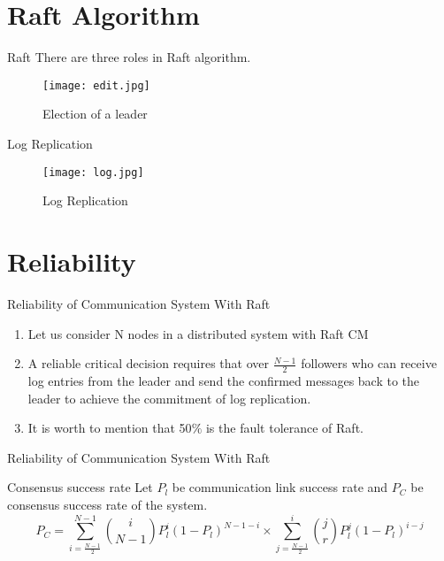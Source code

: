 \documentclass{beamer}
\begin{document}
\section{Raft Algorithm}
\begin{frame}{Raft}
There are three roles in Raft algorithm.
\begin{figure}
    \centering
    \texttt{[image: edit.jpg]}
    \caption{Election of a leader}
\end{figure}

\end{frame}
\begin{frame}{Log Replication}
\begin{figure}
    \centering
    \texttt{[image: log.jpg]}
    \caption{Log Replication}
\end{figure}
    
\end{frame}

\section{Reliability}
\begin{frame}{Reliability of Communication System With Raft}
\begin{enumerate}
  \item
    Let us consider N nodes in a distributed system with
Raft CM
  \item 
  A reliable critical decision requires that over $\frac{N-1}{2}$ followers who can receive log entries from the leader and send the confirmed messages back to the leader to achieve the commitment of log replication.
  \item
  It is worth to mention that 50$\%$ is the fault tolerance of Raft.
\end{enumerate}
\end{frame}
\begin{frame}{Reliability of Communication System With Raft}
\begin{block}{Consensus success rate}
    Let $P_{l}$ be communication link success rate and $P_{C}$ be consensus success rate of the system.
    \begin{equation}
        P_C=\displaystyle\sum_{i=\frac{N-1}{2}}^{N-1}{i \choose N-1} P_{l}^{i} (1-P_{l})^{N-1-i} \times \displaystyle\sum_{j=\frac{N-1}{2}}^{i}{j \choose r} P_{l}^{j} (1-P_{l})^{i-j}
    \end{equation}
\end{block}
\end{frame}
\end{document}

